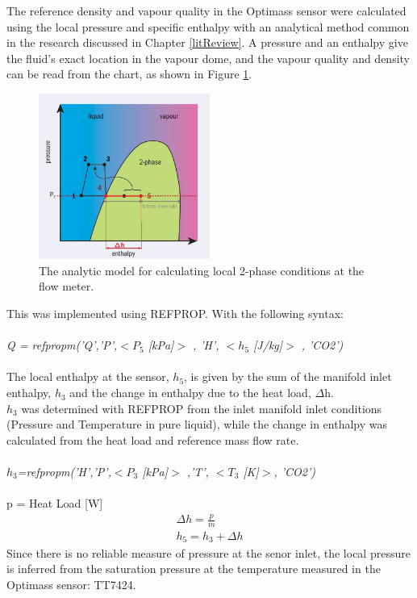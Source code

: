\documentclass{report}
\begin{document}
The reference density and vapour quality in the Optimass sensor were calculated using the local pressure and specific enthalpy with an analytical method common in the research discussed in Chapter \ref{litReview}. A pressure and an enthalpy give the fluid's exact location in the vapour dome, and the vapour quality and density can be read from the chart, as shown in Figure \ref{fig:enthalpyMethod}. \FloatBarrier
\begin{figure}
\includegraphics[width=0.5\textwidth]{enthalpyMethod.jpg}
\caption{The analytic model for calculating local 2-phase conditions at the flow meter.}
\label{fig:enthalpyMethod}
\end{figure}
\FloatBarrier
This was implemented using REFPROP. With the following syntax: \\\\
\textit{Q = refpropm('Q','P',$<P_5$ [kPa]$>$ , 'H', $<h_5$ [J/kg]$>$ , 'CO2')} \\\\
The local enthalpy at the sensor, \textit{$h_5$}, is given by the sum of the manifold inlet enthalpy, $h_3$ and the change in enthalpy due to the heat load, $\Delta$h.\\
\textit{$h_3$} was determined with REFPROP from the inlet manifold inlet conditions (Pressure and Temperature in pure liquid), while the change in enthalpy was calculated from the heat load and reference mass flow rate.\\\\
\textit{$h_3$=refpropm('H','P',$<P_3$ [kPa]$>$ ,'T', $<T_3$ [K]$>$, 'CO2')}\\\\
p = Heat Load [W]\\
\begin{eqnarray}
\Delta h=\frac{p}{\dot{m}}\\
h_5=h_3+\Delta h
\end{eqnarray}
\FloatBarrier
Since there is no reliable measure of pressure at the senor inlet, the local pressure is inferred from the saturation pressure at the temperature measured in the Optimass sensor: TT7424.
\end{document}
